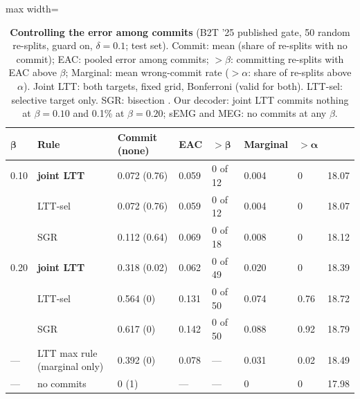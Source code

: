 \begin{table}[t]
  \centering
  \caption{\textbf{Controlling the error among commits} (B2T '25 published gate, 50 random re-splits, guard on, $\delta = 0.1$; test set). Commit: mean (share of re-splits with no commit); EAC: pooled error among commits; $>\beta$: committing re-splits with EAC above $\beta$; Marginal: mean wrong-commit rate ($>\alpha$: share of re-splits above $\alpha$). Joint LTT: both targets, fixed grid, Bonferroni (valid for both). LTT-sel: selective target only. SGR: bisection \citep{geifman2017selective}. Our decoder: joint LTT commits nothing at $\beta = 0.10$ and 0.1\% at $\beta = 0.20$; sEMG and MEG: no commits at any $\beta$.}
  \label{tab:selective}
  \small
  \begin{adjustbox}{max width=\linewidth}\begin{tabular}{@{}llllllll@{}}
    \toprule
    $\boldsymbol\beta$ & \textbf{Rule} & \textbf{Commit (none)} & \textbf{EAC} & $\boldsymbol{>\beta}$ & \textbf{Marginal} & $\boldsymbol{>\alpha}$ & \textbf{\ewpm{}} \\
    \midrule
    0.10 & \textbf{joint LTT} & 0.072 (0.76) & 0.059 & 0 of 12 & 0.004 & 0 & 18.07 \\
         & LTT-sel & 0.072 (0.76) & 0.059 & 0 of 12 & 0.004 & 0 & 18.07 \\
         & SGR & 0.112 (0.64) & 0.069 & 0 of 18 & 0.008 & 0 & 18.12 \\
    0.20 & \textbf{joint LTT} & 0.318 (0.02) & 0.062 & 0 of 49 & 0.020 & 0 & 18.39 \\
         & LTT-sel & 0.564 (0) & 0.131 & 0 of 50 & 0.074 & 0.76 & 18.72 \\
         & SGR & 0.617 (0) & 0.142 & 0 of 50 & 0.088 & 0.92 & 18.79 \\
    --- & LTT max rule (marginal only) & 0.392 (0) & 0.078 & --- & 0.031 & 0.02 & 18.49 \\
    --- & no commits & 0 (1) & --- & --- & 0 & 0 & 17.98 \\
    \bottomrule
  \end{tabular}\end{adjustbox}
\end{table}

